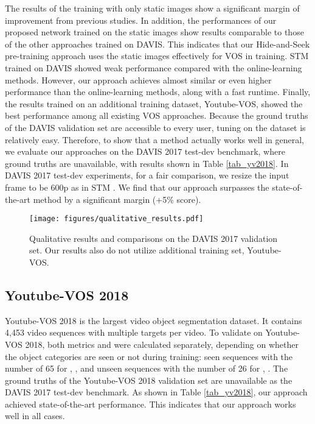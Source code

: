 \documentclass[runningheads]{llncs}
\begin{document}
The results of the training with only static images show a significant margin of improvement from previous studies. In addition, the performances of our proposed network trained on the static images show results comparable to those of the other approaches trained on DAVIS. This indicates that our Hide-and-Seek pre-training approach uses the static images effectively for VOS in training. STM \cite{Oh_2019_ICCV} trained on DAVIS showed weak performance compared with the online-learning methods. However, our approach achieves almost similar or even higher performance than the online-learning methods, along with a fast runtime. Finally, the results trained on an additional training dataset, Youtube-VOS, showed the best performance among all existing VOS approaches. Because the ground truths of the DAVIS validation set are accessible to every user, tuning on the dataset is relatively easy. Therefore, to show that a method actually works well in general, we evaluate our approaches on the DAVIS 2017 test-dev benchmark, where ground truths are unavailable, with results shown in Table \ref{tab_yv2018}. In DAVIS 2017 test-dev experiments, for a fair comparison, we resize the input frame to be 600p as in STM \cite{Oh_2019_ICCV}. We find that our approach surpasses the state-of-the-art method by a significant margin (+5\%  score).


\begin{figure}[t]
\centering
\texttt{[image: figures/qualitative\_results.pdf]}
\caption{
Qualitative results and comparisons on the DAVIS 2017 validation set. Our results also do not utilize additional training set, Youtube-VOS.
}
\label{fig:qualitative_results}
\end{figure}


\subsection{Youtube-VOS 2018}
\label{s44}
Youtube-VOS 2018 \cite{xu2018youtube} is the largest video object segmentation dataset. It contains 4,453 video sequences with multiple targets per video. To validate on Youtube-VOS 2018, both metrics  and  were calculated separately, depending on whether the object categories are seen or not during training: seen sequences with the number of 65 for , , and unseen sequences with the number of 26 for , . The ground truths of the Youtube-VOS 2018 validation set are unavailable as the DAVIS 2017 test-dev benchmark. As shown in Table \ref{tab_yv2018}, our approach achieved state-of-the-art performance. This indicates that our approach works well in all cases.
\end{document}
